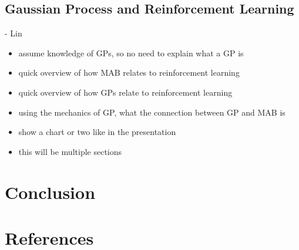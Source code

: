 \documentclass{article}
\begin{document}
\subsection{Gaussian Process and Reinforcement Learning}

- Lin
\begin{itemize}
\item assume knowledge of GPs, so no need to explain what a GP is
\item quick overview of how MAB relates to reinforcement learning
\item quick overview of how GPs relate to reinforcement learning
\item using the mechanics of GP, what the connection between GP and MAB is
\item show a chart or two like in the presentation
\item this will be multiple sections
\end{itemize}

\section{Conclusion}

\section{References}
\end{document}
